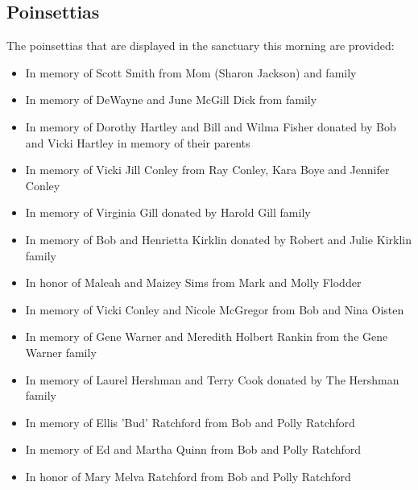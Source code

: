 \vspace{\fill}

\subsection{Poinsettias}
\label{poinsettias}

The poinsettias that are displayed in the sanctuary this morning are provided:

\begin{itemize}
\item In memory of Scott Smith from Mom (Sharon Jackson) and family 
\item In memory of DeWayne and June McGill Dick from family
\item In memory of Dorothy Hartley and Bill and Wilma Fisher donated by Bob and Vicki Hartley in memory of their parents
\item In memory of Vicki Jill Conley from Ray Conley, Kara Boye and Jennifer Conley 
\item In memory of Virginia Gill donated by Harold Gill family
\item In memory of Bob and Henrietta Kirklin donated by Robert and Julie Kirklin family 
\item In honor of Maleah and Maizey Sims from Mark and Molly Flodder
\item In memory of Vicki Conley and Nicole McGregor from Bob and Nina Oisten
\item In memory of Gene Warner and Meredith Holbert Rankin from the Gene Warner family
\item In memory of Laurel Hershman and Terry Cook donated by The Hershman family
\item In memory of Ellis 'Bud' Ratchford from Bob and Polly Ratchford
\item In memory of Ed and Martha Quinn from Bob and Polly Ratchford
\item In honor of Mary Melva Ratchford from Bob and Polly Ratchford
\end{itemize}

\vspace{\fill}
